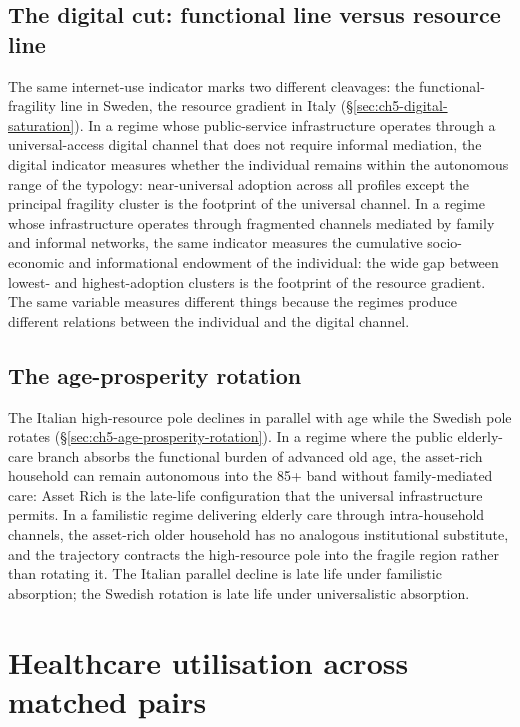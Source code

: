 \subsection{The digital cut: functional line versus resource line}
\label{sec:ch6-digital-cut}

The same internet-use indicator marks two different cleavages: the functional-fragility line in Sweden, the resource gradient in Italy (\S\ref{sec:ch5-digital-saturation}). In a regime whose public-service infrastructure operates through a universal-access digital channel that does not require informal mediation, the digital indicator measures whether the individual remains within the autonomous range of the typology: near-universal adoption across all profiles except the principal fragility cluster is the footprint of the universal channel. In a regime whose infrastructure operates through fragmented channels mediated by family and informal networks, the same indicator measures the cumulative socio-economic and informational endowment of the individual: the wide gap between lowest- and highest-adoption clusters is the footprint of the resource gradient. The same variable measures different things because the regimes produce different relations between the individual and the digital channel.

\subsection{The age-prosperity rotation}
\label{sec:ch6-age-rotation}

The Italian high-resource pole declines in parallel with age while the Swedish pole rotates (\S\ref{sec:ch5-age-prosperity-rotation}). In a regime where the public elderly-care branch absorbs the functional burden of advanced old age, the asset-rich household can remain autonomous into the 85+ band without family-mediated care: Asset Rich is the late-life configuration that the universal infrastructure permits. In a familistic regime delivering elderly care through intra-household channels, the asset-rich older household has no analogous institutional substitute, and the trajectory contracts the high-resource pole into the fragile region rather than rotating it. The Italian parallel decline is late life under familistic absorption; the Swedish rotation is late life under universalistic absorption.

\section{Healthcare utilisation across matched pairs}
\label{sec:ch6-healthcare}

